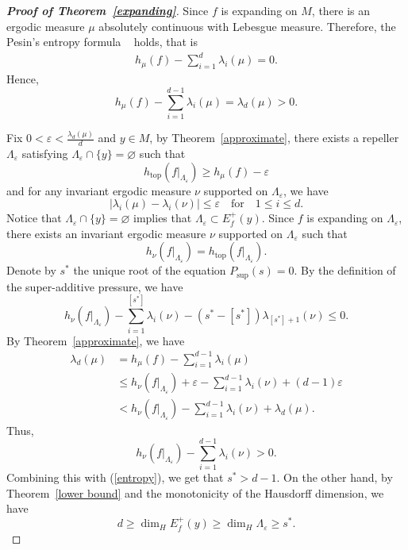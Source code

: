 \documentclass[11pt,a4paper]{amsart}
\theoremstyle{plain}
\theoremstyle{remark}
\begin{document}
	\begin{proof}[\textbf{Proof of Theorem~\ref{expanding}}]
		Since $f$ is expanding on $M$, there is an ergodic measure $\mu$ absolutely continuous with Lebesgue measure. Therefore, the Pesin's entropy formula ~\cite{BP} holds, that is
		\begin{align*}
			h_{\mu}(f)-\sum^{d}_{i=1} \lambda_{i}(\mu)=0.
		\end{align*}
		Hence, $$h_{\mu}(f)-\sum^{d-1}_{i=1} \lambda_{i}(\mu)=\lambda_{d}(\mu)>0.$$
		
		Fix $0<\varepsilon<\frac{\lambda_{d}(\mu)}{d}$ and $y\in M$, by Theorem~\ref{approximate}, there exists a repeller $\Lambda_{\varepsilon}$ satisfying $\Lambda_{\varepsilon}\cap \{y\}=\varnothing$ such that
		$$h_{\text{top}}(f|_{\Lambda_{\varepsilon}})\geq h_{\mu}(f)-\varepsilon$$
		and for any invariant ergodic measure $\nu$ supported on $\Lambda_{\varepsilon}$, we have
		$$|\lambda_{i}(\mu)-\lambda_{i}(\nu)|\leq \varepsilon\quad \text{for} \quad 1\leq i\leq d.$$
		Notice that $\Lambda_{\varepsilon}\cap \{y\}=\varnothing$ implies that $\Lambda_{\varepsilon}\subset E^{+}_{f}(y)$. Since $f$ is expanding on $\Lambda_{\varepsilon}$, there exists an invariant ergodic measure $\nu$ supported on $\Lambda_{\varepsilon}$ such that $$h_{\nu}(f|_{\Lambda_{\varepsilon}})=h_{\text{top}}(f|_{\Lambda_{\varepsilon}}).$$ Denote by $s^{\ast}$ the unique root of the equation $P_{\text{sup}}(s)=0$. By the definition of the super-additive pressure, we have
		\begin{equation}\label{entropy}
			h_{\nu}(f|_{\Lambda_{\varepsilon}})-\sum_{i=1}^{[s^{\ast}]}\lambda_{i}(\nu)-(s^{\ast}-[s^{\ast}])\lambda_{[s^{\ast}]+1}(\nu)\leq 0.
		\end{equation}
		By Theorem~\ref{approximate}, we have
		\begin{align*}
			\lambda_{d}(\mu)&=h_{\mu}(f)-\sum^{d-1}_{i=1} \lambda_{i}(\mu)\\
			&\leq h_{\nu}(f|_{\Lambda_{\varepsilon}})+\varepsilon-\sum_{i=1}^{d-1}\lambda_{i}(\nu)+(d-1)\varepsilon\\
			&<h_{\nu}(f|_{\Lambda_{\varepsilon}})-\sum_{i=1}^{d-1}\lambda_{i}(\nu)+\lambda_{d}(\mu).
		\end{align*}
		Thus, $$h_{\nu}(f|_{\Lambda_{\varepsilon}})-\sum_{i=1}^{d-1}\lambda_{i}(\nu)>0.$$ Combining this with (\ref{entropy}), we get that $s^{\ast}> d-1$. On the other hand, by Theorem~\ref{lower bound} and the monotonicity of the Hausdorff dimension, we have $$d\geq \dim_{H}E^{+}_{f}(y)\geq \dim_{H} \Lambda_{\varepsilon}\geq s^*.$$

\end{proof}
\end{document}
